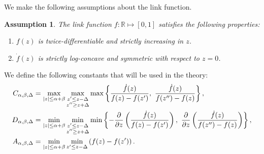 \documentclass{article}
\theoremstyle{plain}
\newtheorem{assumption}{Assumption}
\theoremstyle{definition}
\begin{document}
We make the following assumptions about the link function.
\begin{assumption}\label{ass:joint}
The link function $f\colon \mathbb{R}\mapsto [0,1]$ satisfies the following properties:
\begin{enumerate}
\item $f(z)$ is twice-differentiable and strictly increasing in $z$.
\item $\dot{f}(z)$ is strictly log-concave and symmetric with respect to $z=0$.
\end{enumerate}
\end{assumption}

We define the following constants that will be used in the theory:
\begin{align}\label{eq:constantZ}
C_{\alpha,\beta,\Delta}&=\max_{|z|\leq \alpha+\beta}\max_{\substack{z'\leq z-\Delta\\z''\geq z+\Delta}}\max\left\{ {\dot{f}(z) \over f(z)-f(z')},\ {\dot{f}(z) \over f(z'')-f(z)}\right\},\\
D_{\alpha,\beta,\Delta}&=\min_{|z|\leq \alpha+\beta}\min_{\substack{z'\leq z-\Delta\\z''\geq z+\Delta}}\min\left\{- {\partial\over \partial z}\left({\dot{f}(z) \over f(z)-f(z')}\right),\  {\partial\over \partial z}\left({\dot{f}(z) \over f(z'')-f(z)}\right) \right\},\\
A_{\alpha,\beta,\Delta}&=\min_{|z|\leq \alpha+\beta}\min_{z'\leq z-\Delta} \left(f(z)-f(z')\right).
\end{align}
\end{document}
